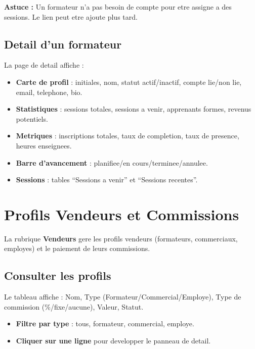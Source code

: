 \documentclass[a4paper,11pt]{article}
\newcommand{\astuce}[1]{\textcolor{tip}{\textbf{Astuce :} #1}}
\begin{document}
\astuce{Un formateur n'a pas besoin de compte pour etre assigne a des sessions. Le lien peut etre ajoute plus tard.}

\subsection{Detail d'un formateur}
La page de detail affiche :
\begin{itemize}
  \item \textbf{Carte de profil} : initiales, nom, statut actif/inactif, compte lie/non lie, email, telephone, bio.
  \item \textbf{Statistiques} : sessions totales, sessions a venir, apprenants formes, revenus potentiels.
  \item \textbf{Metriques} : inscriptions totales, taux de completion, taux de presence, heures enseignees.
  \item \textbf{Barre d'avancement} : planifiee/en cours/terminee/annulee.
  \item \textbf{Sessions} : tables ``Sessions a venir'' et ``Sessions recentes''.
\end{itemize}


\section{Profils Vendeurs et Commissions}

La rubrique \textbf{Vendeurs} gere les profils vendeurs (formateurs, commerciaux, employes) et le paiement de leurs commissions.

\subsection{Consulter les profils}
Le tableau affiche : Nom, Type (Formateur/Commercial/Employe), Type de commission (\%/fixe/aucune), Valeur, Statut.
\begin{itemize}
  \item \textbf{Filtre par type} : tous, formateur, commercial, employe.
  \item \textbf{Cliquer sur une ligne} pour developper le panneau de detail.
\end{itemize}
\end{document}

